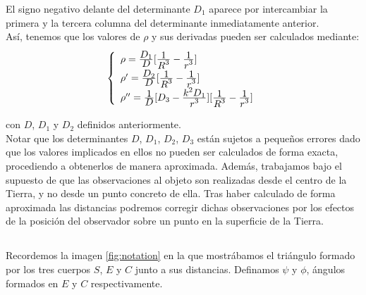 \documentclass[11pt]{article}
\newcommand\ddfrac[2]{\frac{\displaystyle #1}{\displaystyle #2}}
\begin{document}
El signo negativo delante del determinante $D_1$ aparece por intercambiar la primera y la tercera columna del determinante inmediatamente anterior.\\

Así, tenemos que los valores de $\rho$ y sus derivadas pueden ser calculados mediante:
\begin{align}
\left\{
\def\arraystretch{1.5}
\begin{array}{l}
	\rho   = \ddfrac{D_1}{D}[\ddfrac{1}{R^3}-\ddfrac{1}{r^3}]\\
	\rho'  = \ddfrac{D_2}{D}[\ddfrac{1}{R^3}-\ddfrac{1}{r^3}]\\
	\rho'' = \ddfrac{1}{D}[D_3-\ddfrac{k^2D_1}{r^3}][\ddfrac{1}{R^3}-\ddfrac{1}{r^3}]
\end{array}
\right.
\label{eq:rho_values}
\end{align}

\noindent con $D$, $D_1$ y $D_2$ definidos anteriormente.\\

Notar que los determinantes $D$, $D_1$, $D_2$, $D_3$ están sujetos a pequeños errores dado que los valores implicados en ellos no pueden ser calculados de forma exacta, procediendo a obtenerlos de manera aproximada. Además, trabajamos bajo el supuesto de que las observaciones al objeto son realizadas desde el centro de la Tierra, y no desde un punto concreto de ella. Tras haber calculado de forma aproximada las distancias podremos corregir dichas observaciones por los efectos de la posición del observador sobre un punto en la superficie de la Tierra.\\


\subsection{}
\label{subsec:distancias_r_rho}
Recordemos la imagen \ref{fig:notation} en la que mostrábamos el triángulo formado por los tres cuerpos $S$, $E$ y $C$ junto a sus distancias. Definamos $\psi$ y $\phi$, ángulos formados en $E$ y $C$ respectivamente.
\end{document}

